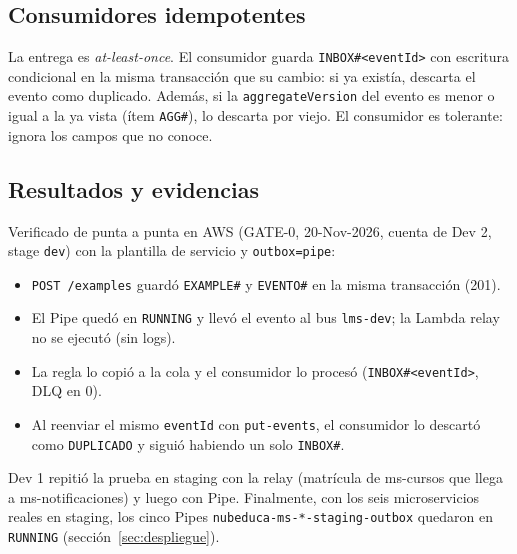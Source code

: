\subsection{Consumidores idempotentes}
La entrega es \textit{at-least-once}. El consumidor guarda \texttt{INBOX\#<eventId>} con escritura
condicional en la misma transacción que su cambio: si ya existía, descarta el evento como duplicado.
Además, si la \texttt{aggregateVersion} del evento es menor o igual a la ya vista (ítem
\texttt{AGG\#}), lo descarta por viejo. El consumidor es tolerante: ignora los campos que no conoce.

\subsection{Resultados y evidencias}
Verificado de punta a punta en AWS (GATE-0, 20-Nov-2026, cuenta de Dev 2, stage \texttt{dev}) con la
plantilla de servicio y \texttt{outbox=pipe}:
\begin{itemize}
  \item \texttt{POST /examples} guardó \texttt{EXAMPLE\#} y \texttt{EVENTO\#} en la misma transacción
        (201).
  \item El Pipe quedó en \texttt{RUNNING} y llevó el evento al bus \texttt{lms-dev}; la Lambda relay
        no se ejecutó (sin logs).
  \item La regla lo copió a la cola y el consumidor lo procesó (\texttt{INBOX\#<eventId>}, DLQ en 0).
  \item Al reenviar el mismo \texttt{eventId} con \texttt{put-events}, el consumidor lo descartó como
        \texttt{DUPLICADO} y siguió habiendo un solo \texttt{INBOX\#}.
\end{itemize}
Dev 1 repitió la prueba en staging con la relay (matrícula de ms-cursos que llega a
ms-notificaciones) y luego con Pipe. Finalmente, con los seis microservicios reales en staging, los
cinco Pipes \texttt{nubeduca-ms-*-staging-outbox} quedaron en \texttt{RUNNING}
(sección~\ref{sec:despliegue}).
